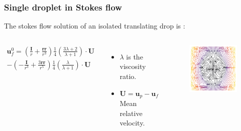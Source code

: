 \documentclass{sintefbeamer}
\begin{document}
\begin{frame}
  \frametitle{Single droplet in Stokes flow}

 

  The stokes flow solution of an isolated translating drop is :
  \begin{columns}
  \begin{multline*}
    \textbf{u}_f^0
    = \left(\frac{ \textbf{I}}{r} + \frac{\textbf{rr}}{r^3}\right)  \frac{1}{4}\left(\frac{3\lambda + 2}{\lambda +1}\right)  \cdot \textbf{U}\\
    - \left(-\frac{\textbf{I}}{r^3} + \frac{3 \textbf{rr} }{r^5}\right)  \frac{1}{4}\left(\frac{\lambda}{\lambda +1}\right)  \cdot \textbf{U}
  \end{multline*}
  \begin{itemize}
      \item $\lambda$ is the viscosity ratio.
      \item  $\textbf{U} = \textbf{u}_p - \textbf{u}_f$ Mean relative velocity. 
  \end{itemize}
  \begin{figure}
    \includegraphics[width=\textwidth]{image/Rising_Stokes.png}
  \end{figure}
  \end{columns}
  


\end{frame}
\end{document}
